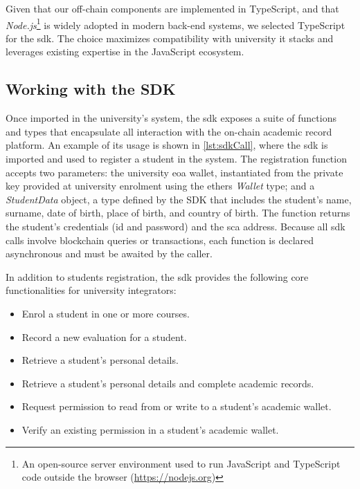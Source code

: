 Given that our off-chain components are implemented in TypeScript, and that \textit{Node.js}\footnote{An open-source server environment used to run JavaScript and TypeScript code outside the browser (\url{https://nodejs.org})} is widely adopted in modern back-end systems, we selected TypeScript for the \gls{sdk}. The choice maximizes compatibility with university \gls{it} stacks and leverages existing expertise in the JavaScript ecosystem.

\subsection{Working with the SDK}
Once imported in the university's system, the \gls{sdk} exposes a suite of functions and types that encapsulate all interaction with the on-chain academic record platform. An example of its usage is shown in \cref{lst:sdkCall}, where the \gls{sdk} is imported and used to register a student in the system. The registration function accepts two parameters: the university \gls{eoa} wallet, instantiated from the private key provided at university enrolment using the ethers \textit{Wallet} type; and a \textit{StudentData} object, a type defined by the SDK that includes the student’s name, surname, date of birth, place of birth, and country of birth. The function returns the student's credentials (\gls{id} and password) and the \gls{sca} address. Because all \gls{sdk} calls involve blockchain queries or transactions, each function is declared asynchronous and must be awaited by the caller.



In addition to students registration, the \gls{sdk} provides the following core functionalities for university integrators:
\begin{itemize}
    \item Enrol a student in one or more courses.
    \item Record a new evaluation for a student.
    \item Retrieve a student’s personal details.
    \item Retrieve a student’s personal details and complete academic records.
    \item Request permission to read from or write to a student’s academic wallet.
    \item Verify an existing permission in a student’s academic wallet.
\end{itemize}

